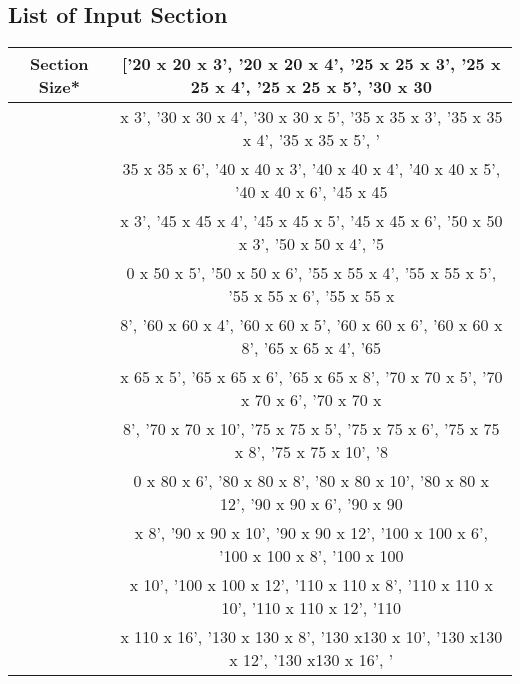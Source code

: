 \documentclass{article}%
\begin{document}
\subsection{List of Input Section}%
\label{subsec:ListofInputSection}%
\renewcommand{\arraystretch}{1.2}%
\begin{longtable}{|p{8cm}|p{8cm}|}%
\hline%
\multicolumn{1}{|c|}{Section Size*}&\multicolumn{1}{|c|}{{[}'20 x 20 x 3', '20 x 20 x 4', '25 x 25 x 3', '25 x 25 x 4', '25 x 25 x 5', '30 x 30}\\%
\hline%
\hline%
\multicolumn{1}{|c|}{ }&\multicolumn{1}{|c|}{ x 3', '30 x 30 x 4', '30 x 30 x 5', '35 x 35 x 3', '35 x 35 x 4', '35 x 35 x 5', '}\\%
\hline%
\hline%
\multicolumn{1}{|c|}{ }&\multicolumn{1}{|c|}{35 x 35 x 6', '40 x 40 x 3', '40 x 40 x 4', '40 x 40 x 5', '40 x 40 x 6', '45 x 45 }\\%
\hline%
\hline%
\multicolumn{1}{|c|}{ }&\multicolumn{1}{|c|}{x 3', '45 x 45 x 4', '45 x 45 x 5', '45 x 45 x 6', '50 x 50 x 3', '50 x 50 x 4', '5}\\%
\hline%
\hline%
\multicolumn{1}{|c|}{ }&\multicolumn{1}{|c|}{0 x 50 x 5', '50 x 50 x 6', '55 x 55 x 4', '55 x 55 x 5', '55 x 55 x 6', '55 x 55 x}\\%
\hline%
\hline%
\multicolumn{1}{|c|}{ }&\multicolumn{1}{|c|}{ 8', '60 x 60 x 4', '60 x 60 x 5', '60 x 60 x 6', '60 x 60 x 8', '65 x 65 x 4', '65}\\%
\hline%
\hline%
\multicolumn{1}{|c|}{ }&\multicolumn{1}{|c|}{ x 65 x 5', '65 x 65 x 6', '65 x 65 x 8', '70 x 70 x 5', '70 x 70 x 6', '70 x 70 x }\\%
\hline%
\hline%
\multicolumn{1}{|c|}{ }&\multicolumn{1}{|c|}{8', '70 x 70 x 10', '75 x 75 x 5', '75 x 75 x 6', '75 x 75 x 8', '75 x 75 x 10', '8}\\%
\hline%
\hline%
\multicolumn{1}{|c|}{ }&\multicolumn{1}{|c|}{0 x 80 x 6', '80 x 80 x 8', '80 x 80 x 10', '80 x 80 x 12', '90 x 90 x 6', '90 x 90}\\%
\hline%
\hline%
\multicolumn{1}{|c|}{ }&\multicolumn{1}{|c|}{ x 8', '90 x 90 x 10', '90 x 90 x 12', '100 x 100 x 6', '100 x 100 x 8', '100 x 100}\\%
\hline%
\hline%
\multicolumn{1}{|c|}{ }&\multicolumn{1}{|c|}{ x 10', '100 x 100 x 12', '110 x 110 x 8', '110 x 110 x 10', '110 x 110 x 12', '110}\\%
\hline%
\hline%
\multicolumn{1}{|c|}{ }&\multicolumn{1}{|c|}{ x 110 x 16', '130 x 130 x 8', '130 x130 x 10', '130 x130 x 12', '130 x130 x 16', '}\\%

\end{longtable}
\end{document}
